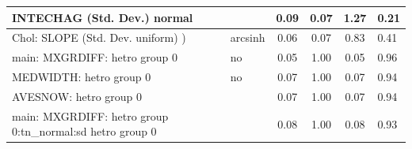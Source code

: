 \begin{table}
\begin{center}
\begin{tabular}{|l|l|c|c|c|l|}
			\hline
			INTECHAG (Std. Dev.) normal &  & 0.09 & 0.07 & 1.27 & 0.21 \\
			\hline
			 Chol: SLOPE (Std. Dev. uniform) ) & arcsinh & 0.06 & 0.07 & 0.83 & 0.41 \\
			\hline
			main: MXGRDIFF: hetro group 0 & no & 0.05 & 1.00 & 0.05 & 0.96 \\
			\hline
			MEDWIDTH: hetro group 0 & no & 0.07 & 1.00 & 0.07 & 0.94 \\
			\hline
			AVESNOW: hetro group 0 &  & 0.07 & 1.00 & 0.07 & 0.94 \\
			\hline
			main: MXGRDIFF: hetro group 0:tn_normal:sd  hetro group 0 &  & 0.08 & 1.00 & 0.08 & 0.93 \\
			\hline
		\end{tabular}
	\end{center}
\end{table}